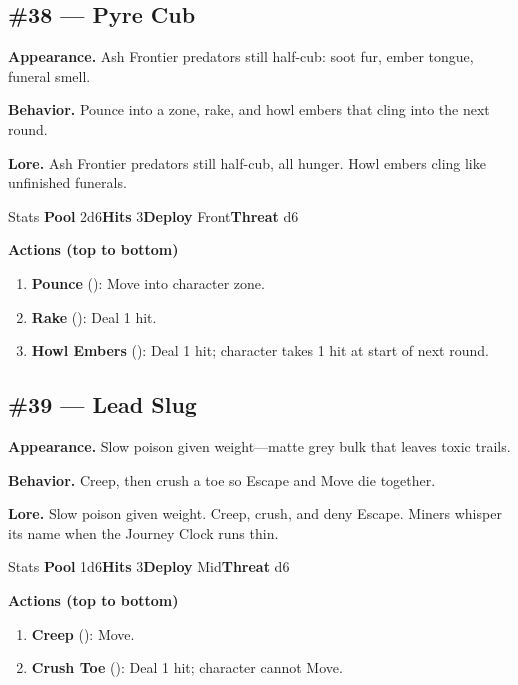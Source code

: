 \subsection*{\#38 --- Pyre Cub}

\textbf{Appearance.} Ash Frontier predators still half-cub: soot fur, ember tongue, funeral smell.

\textbf{Behavior.} Pounce into a zone, rake, and howl embers that cling into the next round.

\textbf{Lore.} Ash Frontier predators still half-cub, all hunger. Howl embers cling like unfinished funerals.

\begin{monsterentry}{Stats}
\textbf{Pool} 2d6\quad\textbf{Hits} 3\quad\textbf{Deploy} Front\quad\textbf{Threat} d6

\textbf{Actions (top to bottom)}
\begin{enumerate}\setlength{\itemsep}{0.15em}\setlength{\parskip}{0pt}
  \item \textbf{Pounce} (\easy): Move into character zone.
  \item \textbf{Rake} (\medium): Deal 1 hit.
  \item \textbf{Howl Embers} (\hard): Deal 1 hit; character takes 1 hit at start of next round.
\end{enumerate}
\end{monsterentry}

\subsection*{\#39 --- Lead Slug}

\textbf{Appearance.} Slow poison given weight---matte grey bulk that leaves toxic trails.

\textbf{Behavior.} Creep, then crush a toe so Escape and Move die together.

\textbf{Lore.} Slow poison given weight. Creep, crush, and deny Escape. Miners whisper its name when the Journey Clock runs thin.

\begin{monsterentry}{Stats}
\textbf{Pool} 1d6\quad\textbf{Hits} 3\quad\textbf{Deploy} Mid\quad\textbf{Threat} d6

\textbf{Actions (top to bottom)}
\begin{enumerate}\setlength{\itemsep}{0.15em}\setlength{\parskip}{0pt}
  \item \textbf{Creep} (\easy): Move.
  \item \textbf{Crush Toe} (\medium): Deal 1 hit; character cannot Move.
\end{enumerate}
\end{monsterentry}

